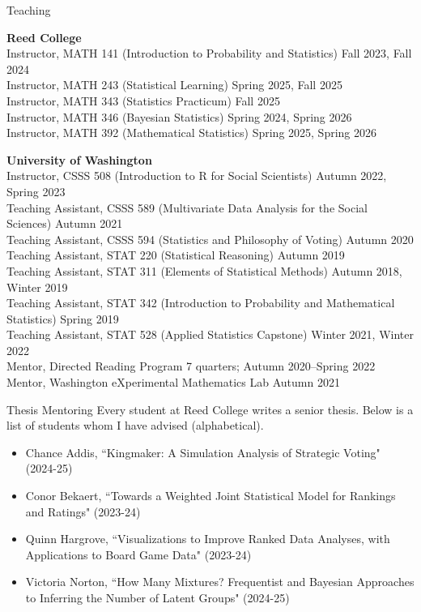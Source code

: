 \documentclass{resume} %
\begin{document}
\begin{rSection}{Teaching}

\textbf{Reed College}
\\ Instructor, MATH 141 (Introduction to Probability and Statistics) \hfill {Fall 2023, Fall 2024}
\\ Instructor, MATH 243 (Statistical Learning) \hfill {Spring 2025, Fall 2025}
\\ Instructor, MATH 343 (Statistics Practicum) \hfill {Fall 2025}
\\ Instructor, MATH 346 (Bayesian Statistics) \hfill {Spring 2024, Spring 2026}
\\ Instructor, MATH 392 (Mathematical Statistics) \hfill {Spring 2025, Spring 2026}

\textbf{University of Washington}
\\ Instructor, CSSS 508 (Introduction to R for Social Scientists) \hfill {Autumn 2022, Spring 2023}
\\ Teaching Assistant, CSSS 589 (Multivariate Data Analysis for the Social Sciences) \hfill Autumn 2021
\\ Teaching Assistant, CSSS 594 (Statistics and Philosophy of Voting) \hfill Autumn 2020
\\ Teaching Assistant, STAT 220 (Statistical Reasoning) \hfill {Autumn 2019}
\\ Teaching Assistant, STAT 311 (Elements of Statistical Methods) \hfill {Autumn 2018, Winter 2019}
\\ Teaching Assistant, STAT 342 (Introduction to Probability and Mathematical Statistics) \hfill {Spring 2019}
\\ Teaching Assistant, STAT 528 (Applied Statistics Capstone) \hfill {Winter 2021, Winter 2022}
\\ Mentor, Directed Reading Program \hfill{7 quarters; Autumn 2020--Spring 2022}
\\ Mentor, Washington eXperimental Mathematics Lab \hfill {Autumn 2021}

\end{rSection}

\begin{rSection}{Thesis Mentoring}
Every student at Reed College writes a senior thesis. Below is a list of students whom I have advised (alphabetical).
\begin{itemize}
\item Chance Addis, ``Kingmaker: A Simulation Analysis of Strategic Voting" (2024-25)
\item Conor Bekaert, ``Towards a Weighted Joint Statistical Model for Rankings and Ratings" (2023-24)
\item Quinn Hargrove, ``Visualizations to Improve Ranked Data Analyses, with Applications to Board Game Data" (2023-24)
\item Victoria Norton, ``How Many Mixtures? Frequentist and Bayesian Approaches to Inferring the Number of Latent Groups" (2024-25)
\end{itemize}

\end{rSection}
\end{document}
